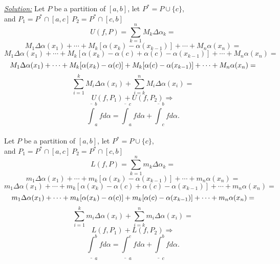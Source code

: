\documentclass{book}
\begin{document}
\begin{tcolorbox}[enhanced,attach boxed title to top center={yshift=-3mm,yshifttext=-1mm},
colback=blue!5!white,colframe=blue!75!black,colbacktitle=red!80!black,
title=Exercise 51.4:,fonttitle=\bfseries,
boxed title style={size=small,colframe=red!50!black} ]
\textit{\color{blue}\underline{Solution:}}
Let $P$ be a partition of $[a,b]$, let $P^*=P\cup \{c\}$,\\
and $P_1=P^*\cap [a,c]~P_2=P^*\cap [c,b]$\\
$$U(f,P)=\sum_{k=1}^n M_k\Delta\alpha_k=$$
$$M_1\Delta\alpha(x_1)+\cdots+M_k[\alpha(x_k)-\alpha(x_{k-1})]+\cdots+M_n\alpha(x_n)=$$
$$M_1\Delta\alpha(x_1)+\cdots+M_k[\alpha(x_k)-\alpha(c)+\alpha(c)-\alpha(x_{k-1})]+\cdots+M_n\alpha(x_n)=$$
$$M_1\Delta\alpha(x_1)+\cdots+M_k[\alpha(x_k)-\alpha(c)\\]+M_k[\alpha(c)-\alpha(x_{k-1})]+\cdots+M_n\alpha(x_n)=$$
$$\sum_{i=1}^k M_i\Delta\alpha(x_i)+\sum_{i=k}^n M_i\Delta\alpha(x_i)=$$
$$U(f,P_1)+U(f,P_2)\Longrightarrow$$
$$\overline{\int}_a^b fd\alpha=\overline{\int}_a^c fd\alpha+\overline{\int}_c^b fd\alpha.$$
\noindent{\color{blue}\rule{\linewidth}{.3mm}}\\
Let $P$ be a partition of $[a,b]$, let $P^*=P\cup \{c\}$,\\
and $P_1=P^*\cap [a,c]~P_2=P^*\cap [c,b]$\\
$$L(f,P)=\sum_{k=1}^n m_k\Delta\alpha_k=$$
$$m_1\Delta\alpha(x_1)+\cdots+m_k[\alpha(x_k)-\alpha(x_{k-1})]+\cdots+m_n\alpha(x_n)=$$
$$m_1\Delta\alpha(x_1)+\cdots+m_k[\alpha(x_k)-\alpha(c)+\alpha(c)-\alpha(x_{k-1})]+\cdots+m_n\alpha(x_n)=$$
$$m_1\Delta\alpha(x_1)+\cdots+m_k[\alpha(x_k)-\alpha(c)\\]+m_k[\alpha(c)-\alpha(x_{k-1})]+\cdots+m_n\alpha(x_n)=$$
$$\sum_{i=1}^k m_i\Delta\alpha(x_i)+\sum_{i=k}^n m_i\Delta\alpha(x_i)=$$
$$L(f,P_1)+L(f,P_2)\Longrightarrow$$
$$\underline{\int}_a^b fd\alpha=\underline{\int}_a^c fd\alpha+\underline{\int}_c^b fd\alpha.$$
\end{tcolorbox}
\end{document}
